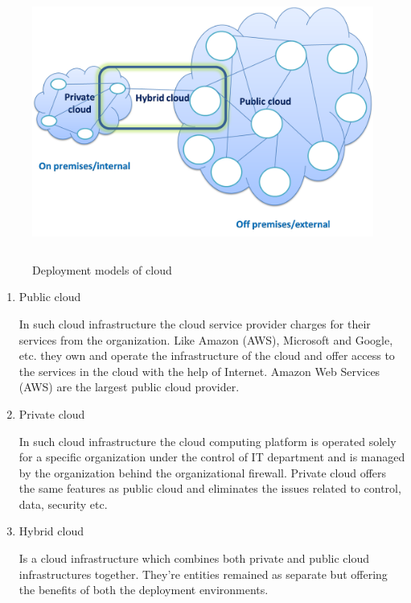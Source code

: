\begin{figure}[h]
 \centering
\includegraphics[width=13cm,height=9cm]{images/types_of_cloud.png}
 \caption{Deployment models of cloud}
\end{figure}

\par
\begin{enumerate}

\item Public cloud  
\par
In such cloud infrastructure the cloud service provider charges for their services from the organization. Like Amazon (AWS), Microsoft and Google, etc. they own and operate the infrastructure of the cloud and offer access to the services in the cloud with the help of Internet. Amazon Web Services (AWS) are the largest public cloud provider\cite{deploy}.

\item Private cloud
\par
In such cloud infrastructure the cloud computing platform is operated solely for a specific organization under the control of IT department and is managed by the organization behind the organizational firewall. Private cloud offers the same features as public cloud and eliminates the issues related to control, data, security etc\cite{deploy}.


\item Hybrid cloud
\par
Is a cloud infrastructure which combines both private and public cloud infrastructures together. They're entities remained as separate but offering the benefits of both the deployment environments\cite{deploy}.
\end{enumerate}

